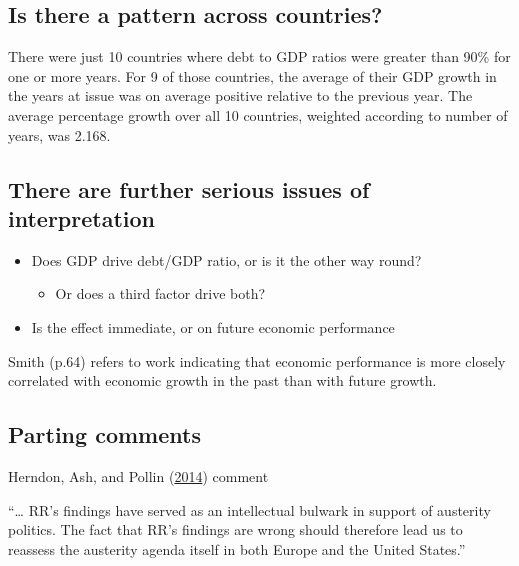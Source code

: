 \documentclass[
  10ptls,
  b5paper]{book}
\providecommand{\tightlist}{%
  \setlength{\itemsep}{0pt}\setlength{\parskip}{0pt}}
\begin{document}
\hypertarget{is-there-a-pattern-across-countries}{%
\subsection*{Is there a pattern across countries?}\label{is-there-a-pattern-across-countries}}

There were just 10 countries where debt to GDP ratios were
greater than 90\% for one or more years. For 9 of
those countries, the average of their GDP growth in the years at issue
was on average positive relative to the previous year. The average
percentage growth over all 10 countries, weighted according
to number of years, was 2.168.

\hypertarget{there-are-further-serious-issues-of-interpretation}{%
\subsection*{There are further serious issues of interpretation}\label{there-are-further-serious-issues-of-interpretation}}

\begin{itemize}
\tightlist
\item
  Does GDP drive debt/GDP ratio, or is it the other way round?

  \begin{itemize}
  \tightlist
  \item
    Or does a third factor drive both?
  \end{itemize}
\item
  Is the effect immediate, or on future economic performance
\end{itemize}

Smith (p.64) refers to work indicating that economic performance
is more closely correlated with economic growth in the past than
with future growth.

\hypertarget{parting-comments}{%
\subsection*{Parting comments}\label{parting-comments}}

Herndon, Ash, and Pollin (\protect\hyperlink{ref-herndon2014does}{2014}) comment

``\ldots{} RR's findings have served as an intellectual bulwark in support of austerity politics. The fact that RR's findings are wrong should therefore lead us to reassess the austerity agenda itself in both Europe and the United States.''
\end{document}

